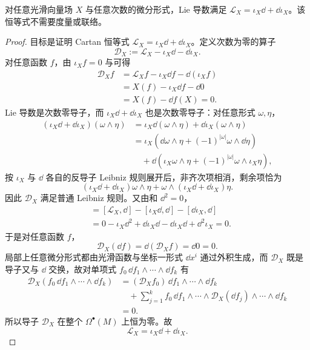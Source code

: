 \begin{theorem}
对任意光滑向量场 $X$ 与任意次数的微分形式，Lie 导数满足 $\mathcal L_X=\iota_X\dd+\dd\iota_X$。该恒等式不需要度量或联络。
\end{theorem}
\begin{proof}
目标是证明 Cartan 恒等式 $\mathcal L_X=\iota_X\dd+\dd\iota_X$。定义次数为零的算子
\begin{equation*}
\mathscr D_X:=\mathcal L_X-\iota_{X}\dd-\dd\iota_{X}.
\end{equation*}
对任意函数 $f$，由 $\iota_{X}f=0$ 与可得
\begin{align*}
\mathscr D_Xf
&=\mathcal L_X f-\iota_{X}\dd f-\dd(\iota_{X}f)\\
&=X(f)-\iota_{X}\dd f-\dd 0\\
&=X(f)-\dd f(X)=0.
\end{align*}
Lie 导数是次数零导子，而 $\iota_{X}\dd+\dd\iota_{X}$ 也是次数零导子：对任意形式 $\omega,\eta$，
\begin{align*}
(\iota_{X}\dd+\dd\iota_{X})(\omega\wedge\eta)
&=\iota_{X}\dd(\omega\wedge\eta)+\dd\iota_{X}(\omega\wedge\eta)\\
&=\iota_{X}(\dd\omega\wedge\eta+(-1)^{|\omega|}\omega\wedge\dd\eta)\\
&\quad+\dd(\iota_{X}\omega\wedge\eta+(-1)^{|\omega|}\omega\wedge\iota_{X}\eta),
\end{align*}
按 $\iota_{X}$ 与 $\dd$ 各自的反导子 Leibniz 规则展开后，非齐次项相消，剩余项恰为
\begin{equation*}
(\iota_{X}\dd+\dd\iota_{X})\omega\wedge\eta
+\omega\wedge(\iota_{X}\dd+\dd\iota_{X})\eta.
\end{equation*}
因此 $\mathscr D_X$ 满足普通 Leibniz 规则。又由和 $\dd^2=0$，
\begin{align*}
[\mathscr D_X,\dd]
&=[\mathcal L_X,\dd]-[\iota_{X}\dd,\dd]-[\dd\iota_{X},\dd]\\
&=0-\iota_{X}\dd^2+\dd\iota_{X}\dd-\dd\iota_{X}\dd+\dd^2\iota_{X}=0.
\end{align*}
于是对任意函数 $f$，
\begin{equation*}
\mathscr D_X(\dd f)=\dd(\mathscr D_X f)=\dd 0=0.
\end{equation*}
局部上任意微分形式都由光滑函数与坐标一形式 $\dd x^i$ 通过外积生成，而 $\mathscr D_X$ 既是导子又与 $\dd$ 交换，故对单项式 $f_0\,\dd f_1\wedge\cdots\wedge\dd f_k$ 有
\begin{align*}
\mathscr D_X(f_0\,\dd f_1\wedge\cdots\wedge\dd f_k)
&=(\mathscr D_X f_0)\,\dd f_1\wedge\cdots\wedge\dd f_k\\
&\quad+\sum_{j=1}^k f_0\,\dd f_1\wedge\cdots\wedge\mathscr D_X(\dd f_j)\wedge\cdots\wedge\dd f_k\\
&=0.
\end{align*}
所以导子 $\mathscr D_X$ 在整个 $\Omega^\bullet(M)$ 上恒为零。故
\begin{equation}\label{eq:math-dg-synthesis-cartan}
\boxed{\mathcal L_X=\iota_{X}\dd+\dd\iota_{X}.}
\end{equation}
\end{proof}
